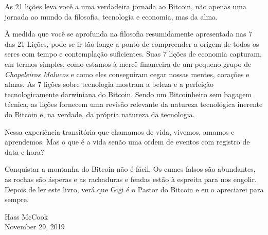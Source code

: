 As 21 lições leva você a uma verdadeira jornada ao Bitcoin, não apenas uma jornada ao mundo da filosofia, tecnologia e economia, mas da alma.

À medida que você se aprofunda na filosofia resumidamente apresentada nas 7 das 21 Lições, pode-se ir tão longe a ponto de compreender a origem de todos os seres com tempo e contemplação suficientes. Suas 7 lições de economia capturam, em termos simples, como estamos à mercê financeira de um pequeno grupo de \textit{Chapeleiros Malucos} e como eles conseguiram cegar nossas mentes, corações e almas. As 7 lições sobre tecnologia mostram a beleza e a perfeição tecnologicamente darwiniana do Bitcoin. Sendo um Bitcoinheiro sem bagagem técnica, as lições fornecem uma revisão relevante da natureza tecnológica inerente do Bitcoin e, na verdade, da própria natureza da tecnologia.

Nessa experiência transitória que chamamos de vida, vivemos, amamos e aprendemos. Mas o que é a vida senão uma ordem de eventos com registro de data e hora?

Conquistar a montanha do Bitcoin não é fácil. Os cumes falsos são abundantes, as rochas são ásperas e as rachaduras e fendas estão à espreita para nos engolir. Depois de ler este livro, verá que Gigi é o Pastor do Bitcoin e eu o apreciarei para sempre.

\begin{flushright}
  Hass McCook \\
  November 29, 2019
\end{flushright}
